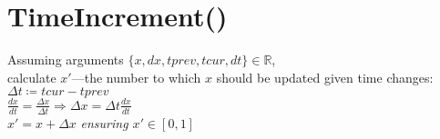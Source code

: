 \documentclass[12pt]{article}
\begin{document}

	\section*{TimeIncrement()}
	
	Assuming arguments $\{x, dx, tprev, tcur, dt\}\in\mathbb{R}$,\\
	calculate $x'$—the number to which $x$ should be updated given time changes:\\
	
	$\Delta t\coloneqq tcur - tprev$\\
	
	$\frac{dx}{dt} = \frac{\Delta x}{\Delta t}\Rightarrow\Delta x = \Delta t\frac{dx}{dt}$\\
	
	$x' = x + \Delta x$ \textit{ensuring $x'\in [0,1]$}\\
	
\end{document}
